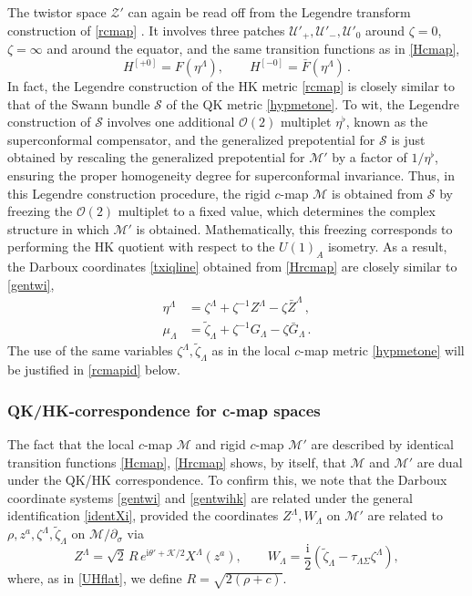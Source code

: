 \documentclass[12pt,reqno]{article}
\numberwithin{equation}{section}
\newcommand{\be}{\begin{equation}}
\newcommand{\ee}{\end{equation}}
\def\bZ{\bar Z}
\def\bF{\bar F}
\def\bG{\bar G}
\newcommand{\I}{\mathrm{i}}
\newcommand{\cS}{\mathcal{S}}
\newcommand{\cK}{\mathcal{K}}
\newcommand{\cM}{\mathcal{M}}
\newcommand{\cO}{\mathcal{O}}
\newcommand{\cU}{\mathcal{U}}
\newcommand{\cZ}{\mathcal{Z}}
\def\Hij#1{H^{[#1]}}
\def\pa{\partial}
\newcommand{\tzeta}{{\tilde\zeta}}
\def\varpihk{\zeta}
\def\phip{{\theta'}}
\def\pcM{\cM'}
\def\pcZ{\cZ'}
\def\rigZ{Z}
\def\brigZ{\bZ}
\numberwithin{equation}{section}
\begin{document}
The twistor
space $\pcZ$ can again be read off from the Legendre transform construction
of \eqref{rcmap} \cite{Rocek:2006xb}. It involves three patches $\cU'_+, \cU'_-,
\cU'_0$ around $\varpihk=0$, $\varpihk=\infty$ and around the equator, and the
same transition  functions as in \eqref{Hcmap},
\be
\label{Hrcmap}
\Hij{+ 0}=F(\eta^\Lambda), \qquad \Hij{- 0}=\bF(\eta^\Lambda) \, .
\ee
In fact, the Legendre construction of the HK metric \eqref{rcmap} is closely similar
to that of the Swann bundle $\cS$ of the QK metric \eqref{hypmetone}. To wit,
 the Legendre construction of $\cS$ involves  one additional $\cO(2)$ multiplet $\eta^\flat$,
known as the superconformal compensator, and the generalized prepotential for $\cS$
is just obtained by rescaling the  generalized prepotential for $\pcM$ by a factor
of $1/\eta^\flat$, ensuring the proper homogeneity degree for superconformal invariance.
Thus, in this Legendre construction procedure, the rigid $c$-map $\cM$ is obtained from
$\cS$ by freezing the $\cO(2)$ multiplet  to a fixed value,  which determines
the complex structure in which $\pcM$ is obtained.
Mathematically, this freezing corresponds to performing the HK quotient with respect to the $U(1)_A$ isometry.
As a result, the Darboux coordinates \eqref{txiqline}
obtained from \eqref{Hrcmap} are closely similar to \eqref{gentwi},
\be
\label{gentwihk}
\begin{split}
\eta^\Lambda &=\zeta^\Lambda+ \varpihk^{-1} \rigZ^\Lambda - \varpihk\brigZ^\Lambda\, ,
\\
\mu_\Lambda&=\tzeta_\Lambda+  \varpihk^{-1} G_\Lambda - \varpihk\bG_\Lambda\, .
\end{split}
\ee
The use of the same variables $\zeta^\Lambda,\tzeta_\Lambda$ as in the local $c$-map metric \eqref{hypmetone} will
be justified in \eqref{rcmapid} below.


\subsubsection{QK/HK-correspondence for c-map spaces}
\label{QKHKcmap}

The fact that the local $c$-map $\cM$ and rigid $c$-map $\pcM$ are described by
identical transition functions \eqref{Hcmap}, \eqref{Hrcmap}
shows, by itself, that $\cM$ and $\pcM$ are dual under
the QK/HK correspondence. To confirm this, we
note that the Darboux coordinate systems \eqref{gentwi}
and \eqref{gentwihk} are related under the general identification \eqref{identXi},
provided
the coordinates $\rigZ^\Lambda,W_\Lambda$ on $\pcM$ are related to
$\rho,z^a,\zeta^\Lambda,\tzeta_\Lambda$ on $\cM/\pa_{\sigma}$ via
\be
\label{rcmapid}
\rigZ^\Lambda = \sqrt{2} \, R \, e^{\I\phip+\cK/2} X^\Lambda(z^a) ,
\qquad
W_\Lambda
= \frac{\I}{2} \left( \tzeta_\Lambda - \tau_{\Lambda\Sigma} \zeta^\Lambda \right) ,
\ee
where, as in \eqref{UHflat}, we define $R=\sqrt{2(\rho+c)}$.
\end{document}
